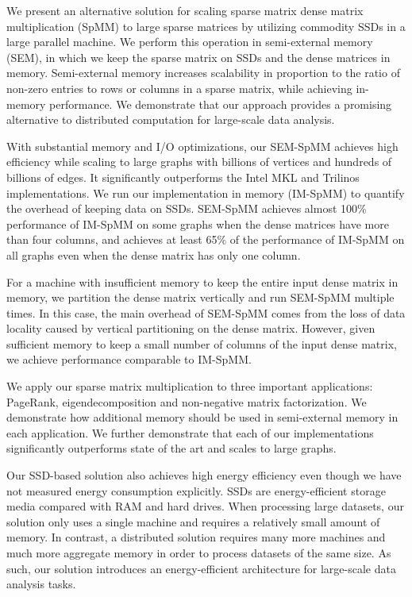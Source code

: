 We present an alternative solution for scaling sparse matrix dense matrix
multiplication (SpMM) to large sparse matrices by utilizing commodity SSDs
in a large parallel machine. We perform this operation in semi-external memory
(SEM), in which we keep the sparse matrix on SSDs and the dense matrices in
memory. Semi-external memory increases scalability in proportion to the ratio
of non-zero entries to rows or columns in a sparse matrix, while achieving
in-memory performance. We demonstrate
that our approach provides a promising alternative to distributed computation
for large-scale data analysis.

With substantial memory and I/O optimizations, our SEM-SpMM achieves high
efficiency while scaling to large graphs with
billions of vertices and hundreds of billions of edges. It significantly
outperforms the Intel MKL and Trilinos implementations. We run our
implementation in memory (IM-SpMM) to quantify the overhead of keeping data
on SSDs. SEM-SpMM achieves almost 100\% performance of IM-SpMM on some graphs
when the dense matrices have more than four columns, and achieves at least 65\%
of the performance of IM-SpMM on all graphs even when the dense matrix
has only one column.

For a machine with insufficient memory to keep the entire input dense matrix
in memory, we partition the dense matrix vertically and run SEM-SpMM multiple
times. In this case, the main overhead of SEM-SpMM comes from the loss of
data locality caused by vertical partitioning on the dense matrix. However,
given sufficient memory to keep a small number of columns of the input dense
matrix, we achieve performance comparable to IM-SpMM.

We apply our sparse matrix multiplication to three important applications:
PageRank, eigendecomposition and non-negative matrix factorization. We demonstrate
how additional memory should be used in semi-external memory in each application.
We further demonstrate that each of our implementations significantly outperforms
state of the art and scales to large graphs.

Our SSD-based solution also achieves high energy efficiency even though
we have not measured energy consumption explicitly. SSDs are energy-efficient
storage media \cite{Tsirogiannis} compared with RAM and hard drives.
When processing large datasets, our solution only uses
a single machine and requires a relatively small amount of memory. In contrast,
a distributed solution requires many more machines and much more aggregate
memory in order to process datasets of the same size. As such, our solution
introduces an energy-efficient architecture for large-scale data analysis tasks.
